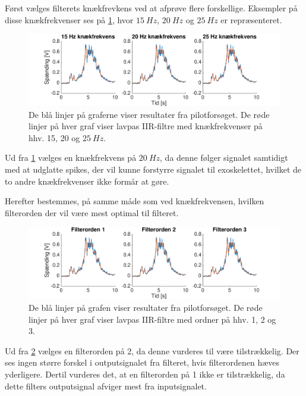 Først vælges filterets knækfrevkens ved at afprøve flere forskellige. Eksempler på disse knækfrekvenser ses på \ref{fig:lp_knaek}, hvor $15~Hz$, $20~Hz$ og $25~Hz$ er repræsenteret. 

\begin{figure} [H]
\centering
\includegraphics[width=1.2\textwidth]{figures/problemloesning/lavpas_knaek.pdf}
\caption{De blå linjer på graferne viser resultater fra pilotforsøget. De røde linjer på hver graf viser lavpas IIR-filtre med knækfrekvenser på hhv. 15, 20 og $25~Hz$.}
\label{fig:lp_knaek}
\end{figure} 

\noindent
Ud fra \ref{fig:lp_knaek} vælges en knækfrekvens på $20~Hz$, da denne følger signalet samtidigt med at udglatte spikes, der vil kunne forstyrre signalet til exoskelettet, hvilket de to andre knækfrekvenser ikke formår at gøre.

Herefter bestemmes, på samme måde som ved knækfrekvensen, hvilken filterorden der vil være mest optimal til filteret. 

\begin{figure} [H]
\centering
\includegraphics[width=1.2\textwidth]{figures/problemloesning/lavpas_orden.pdf}
\caption{De blå linjer på grafen viser resultater fra pilotforsøget. De røde linjer på hver graf viser lavpas IIR-filtre med ordner på hhv. 1, 2 og 3.}
\label{fig:lp_orden}
\end{figure} 

\noindent
Ud fra \ref{fig:lp_orden} vælges en filterorden på 2, da denne vurderes til være tilstrækkelig. Der ses ingen større forskel i outputsignalet fra filteret, hvis filterordenen hæves yderligere. Dertil vurderes det, at en filterorden på 1 ikke er tilstrækkelig, da dette filters outputsignal afviger mest fra inputsignalet. 

